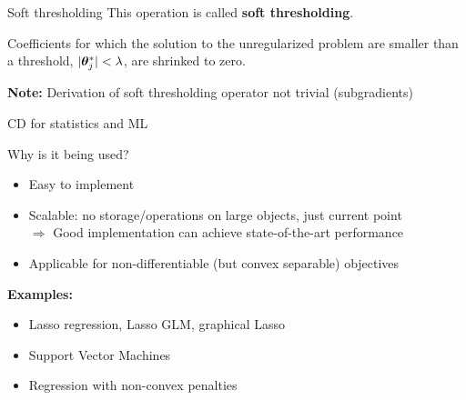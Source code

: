 \documentclass[11pt,compress,t,notes=noshow, xcolor=table]{beamer}
\begin{document}
\begin{vbframe}{Soft thresholding}
This operation is called \textbf{soft thresholding}.

\medskip

Coefficients for which the solution to the unregularized problem are smaller than a threshold, $|\bm{\theta}^\ast_j| < \lambda$, are shrinked to zero. 

\medskip


\textbf{Note:} Derivation of soft thresholding operator not trivial (subgradients)

\end{vbframe}


\begin{vbframe}{CD for statistics and ML}

Why is it being used?

\begin{itemize}
\item Easy to implement
\item Scalable: no storage/operations on large objects,
  just current point \\
    $\Rightarrow$ Good implementation can achieve state-of-the-art performance
\item Applicable for non-differentiable (but convex separable) objectives
\end{itemize}

\medskip

\textbf{Examples:}
\begin{itemize}
\item Lasso regression, Lasso GLM, graphical Lasso
\item Support Vector Machines
\item Regression with non-convex penalties
\end{itemize}




\end{vbframe}


\endlecture
\end{document}
